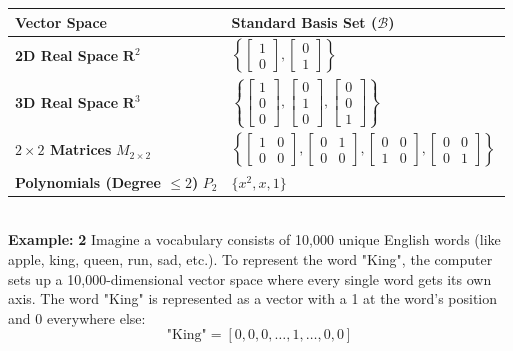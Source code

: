 \documentclass[DIV=20,oneside]{scrartcl}
\newcommand{\example}{
	\noindent\textbf{\\Example: }
}
\begin{document}
\begin{center}
	\begin{tabular}{|l|l|}
		\hline
		\textbf{Vector Space} & \textbf{Standard Basis Set ($\mathcal{B}$)}\,
		\\ 
		\hline
		\textbf{2D Real Space} $\mathbf{R}^2$ & $\left\{ \begin{bmatrix} 1 \\ 0 \end{bmatrix}, \begin{bmatrix} 0 \\ 1 \end{bmatrix} \right\}$\,
		\\ \hline
		\textbf{3D Real Space} $\mathbf{R}^3$ & $\left\{ \begin{bmatrix} 1 \\ 0 \\ 0 \end{bmatrix}, \begin{bmatrix} 0 \\ 1 \\ 0 \end{bmatrix}, \begin{bmatrix} 0 \\ 0 \\ 1 \end{bmatrix} \right\}$\,
		\\ \hline
		\textbf{$2 \times 2$ Matrices} $M_{2\times2}$ & $\left\{ \begin{bmatrix} 1 & 0 \\ 0 & 0 \end{bmatrix}, \begin{bmatrix} 0 & 1 \\ 0 & 0 \end{bmatrix}, \begin{bmatrix} 0 & 0 \\ 1 & 0 \end{bmatrix}, \begin{bmatrix} 0 & 0 \\ 0 & 1 \end{bmatrix} \right\}$\,
		\\ \hline
		\textbf{Polynomials (Degree $\le 2$)} $P_2$ & $\{x^2, x, 1\}$\, \\ \hline
	\end{tabular}
\end{center}
\renewcommand{\arraystretch}{1}
\example \textbf{2}
Imagine a vocabulary consists of 10,000 unique English words (like apple, king, queen, run, sad, etc.). To represent the word "King", the computer sets up a 10,000-dimensional vector space where every single word gets its own axis. The word "King" is represented as a vector with a 1 at the word's position and 0 everywhere else:$$\text{"King"} = [0, 0, 0, \dots, 1, \dots, 0, 0]$$
\end{document}
